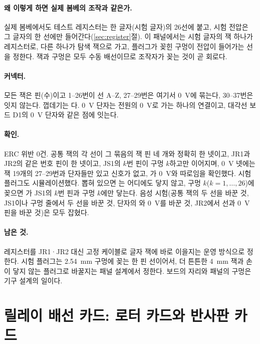 \paragraph{왜 이렇게 하면 실제 봄베의 조작과 같은가.} 실제 봄베에서도 테스트 레지스터는 한 글자(시험 글자)의 26선에
붙고, 시험 전압은 그 글자의 한 선에만 들어간다(\ref{sec:register}절). 이 패널에서는 시험 글자의 잭 하나가 레지스터로, 다른 하나가 탐색 잭으로
가고, 플러그가 꽂힌 구멍이 전압이 들어가는 선을 정한다. 잭과 구멍은 모두 수동 배선이므로 조작자가 꽂는 것이 곧
회로다.

\paragraph{커넥터.} 모든 잭은 핀(수)이고 1--26번이 선 A--Z, 27--29번은 여기서 0~V에 묶는다, 30--37번은 잇지 않는다.
껍데기는 다. 0~V 단자는 전원의 0~V로 가는 하나의 연결이고, 대각선 보드 D1의 0~V 단자와 같은 점에 잇는다.

\paragraph{확인.} ERC 위반 0건. 공통 잭의 각 선이 그 묶음의 잭 핀 네 개와 정확히 한 넷이고, JR1과 JR2의 같은 번호
핀이 한 넷이고, JS1의 $k$번 핀이 구멍 $k$하고만 이어지며, 0~V 넷에는 잭 19개의 27--29번과 단자들만 있고 신호가
없고, 가 0~V와 따로임을 확인했다. 시험 플러그도 시뮬레이션했다. 뽑혀 있으면 는 어디에도
닿지 않고, 구멍 $k$($k = 1, \dots, 26$)에 꽂으면 가 JS1의 $k$번 핀과 구멍 $k$에만 닿는다. 음성 시험(공통 잭의
두 선을 바꾼 것, JS1이나 구멍 줄에서 두 선을 바꾼 것, 단자의 와 0~V를 바꾼 것, JR2에서 선과 0~V 핀을 바꾼
것)은 모두 잡혔다.

\paragraph{남은 것.} 레지스터를 JR1·JR2 대신 고정 케이블로 글자 잭에 바로 이을지는 운영 방식으로 정한다. 시험
플러그는 2.54~mm 구멍에 꽂는 한 핀 선이어서, 더 튼튼한 4~mm 잭과 손이 닿지 않는 플러그로 바꿀지는 패널 설계에서
정한다. 보드의 자리와 패널의 구멍은 기구 설계의 일이다.


\section{릴레이 배선 카드: 로터 카드와 반사판 카드}\label{sch:wiring-cards}


